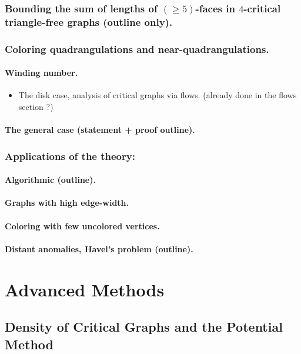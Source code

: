 \documentclass[12pt,twoside,openright,a4paper]{book}
\begin{document}
\section{Bounding the sum of lengths of $(\ge\!5)$-faces in $4$-critical triangle-free graphs (outline only).}
\section{Coloring quadrangulations and near-quadrangulations.}

\subsection{ Winding number.}
\begin{itemize}
\item The disk case, analysis of critical graphs via flows. (already done in the flows section ?)
\end{itemize}

\subsection{The general case (statement + proof outline).}

\section{Applications of the theory:}
\subsection{Algorithmic (outline).}
\subsection{Graphs with high edge-width.}
\subsection{Coloring with few uncolored vertices.}
\subsection{Distant anomalies, Havel's problem (outline).}

\part{Advanced Methods}

\chapter{Density of Critical Graphs and the Potential Method}\label{chap:potential}
\end{document}
